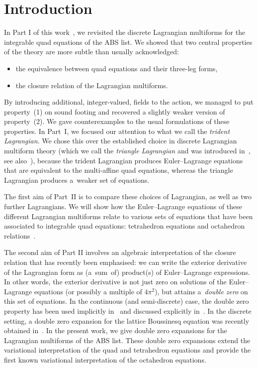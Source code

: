 \documentclass[pdftex]{sigma}
\numberwithin{equation}{section}
\begin{document}


\section{Introduction}

In Part I of this work~\cite{richardson2025discrete1}, we revisited the discrete Lagrangian multiforms for the integrable quad equations of the ABS list. We showed that two central properties of the theory are more subtle than usually acknowledged:
\begin{itemize}	\itemsep=0pt
 \item[(1)] the equivalence between quad equations and their three-leg forms,
 \item[(2)] the closure relation of the Lagrangian multiforms.
\end{itemize}
By introducing additional, integer-valued, fields to the action, we managed to put property~(1) on sound footing and recovered a slightly weaker version of property~(2). We gave counterexamples to the usual formulations of these properties.
In Part~I, we focused our attention to what we call the \emph{trident Lagrangian}. We chose this over the established choice in discrete Lagrangian multiform theory (which we call the \emph{triangle Lagrangian} and was introduced in~\cite{lobb2009lagrangian}, see also~\mbox{\cite{bobenko2010lagrangian, boll2014integrability, boll2016integrability, lobb2018variational, xenitidis2011lagrangian}}), because the trident Lagrangian produces Euler--Lagrange equations that are equivalent to the multi-affine quad equations, whereas the triangle Lagrangian produces a~weaker set of equations.

The first aim of Part~II is to compare these choices of Lagrangian, as well as two further Lagrangians. We will show how the Euler--Lagrange equations of these different Lagrangian multiforms relate to various sets of equations that have been associated to integrable quad equations: tetrahedron equations and octahedron relations~\cite{boll2014integrability, boll2016integrability}.

The second aim of Part II involves an algebraic interpretation of the closure relation that has recently been emphasised: we can write the exterior derivative of the Lagrangian form as (a~sum~of) product(s) of Euler--Lagrange expressions. In other words, the exterior derivative is not just zero on solutions of the Euler--Lagrange equations \big(or possibly a multiple of $4 \pi^2$\big), but attains a~\emph{double zero} on this set of equations.
In the continuous (and semi-discrete) case, the double zero property has been used implicitly in~\cite{sleigh2020variational, suris2016variational} and discussed explicitly in~\mbox{\cite{caudrelier2023lagrangiana, petrera2021variational, sleigh2022semi}}. In the discrete setting, a double zero expansion for the lattice Boussinesq equation was recently obtained in~\cite{nijhoff2024lagrangian}. In the present work, we give double zero expansions for the Lagrangian multiforms of the ABS list.
These double zero expansions extend the variational interpretation of the quad and tetrahedron equations and provide the first known variational interpretation of the octahedron equations.
\end{document}
